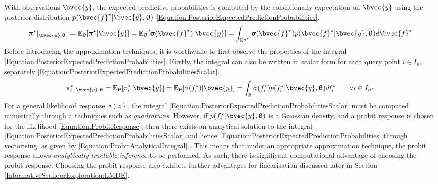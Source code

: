 				With observations $\bvec{y}$, the expected predictive probabilities is computed by the conditionally expectation on $\bvec{y}$ using the posterior distribution $p(\bvec{f}^{\star} | \bvec{y}, \vec{\uptheta})$ \eqref{Equation:PosteriorExpectedPredictionProbabilities}. \begin{equation}
					\bar{\vec{\uppi}}^{\star} |_{\bvec{y}, \vec{\uptheta}} := \mathbb{E}_{\vec{\uptheta}}[\vec{\uppi}^{\star} | \bvec{y}] = \mathbb{E}_{\vec{\uptheta}}[\vec{\upsigma}(\bvec{f}^{\star}) | \bvec{y}] = \int_{\mathbb{R}^{n^{\star}}} \vec{\upsigma}(\bvec{f}^{\star}) p(\bvec{f}^{\star} | \bvec{y}, \vec{\uptheta}) d \bvec{f}^{\star}
				\label{Equation:PosteriorExpectedPredictionProbabilities}
				\end{equation} Before introducing the approximation techniques, it is worthwhile to first observe the properties of the integral \eqref{Equation:PosteriorExpectedPredictionProbabilities}. Firstly, the integral can also be written in scalar form for each query point $i \in I_{n^{\star}}$ separately \eqref{Equation:PosteriorExpectedPredictionProbabilitiesScalar}. \begin{equation}
					 \bar{\pi}^{\star}_{i} |_{\bvec{y}, \vec{\uptheta}} = \mathbb{E}_{\vec{\uptheta}}[\pi^{\star}_{i} | \bvec{y}] = \mathbb{E}_{\vec{\uptheta}}[\sigma(f^{\star}_{i}) | \bvec{y}] = \int_{\mathbb{R}} \sigma(f^{\star}_{i}) p(f^{\star}_{i} | \bvec{y}, \vec{\uptheta}) d f^{\star}_{i} \qquad \forall i \in I_{n^{\star}}
				\label{Equation:PosteriorExpectedPredictionProbabilitiesScalar}
				\end{equation} For a general likelihood response $\sigma(z)$, the integral \eqref{Equation:PosteriorExpectedPredictionProbabilitiesScalar} must be computed numerically through a techniques such as \textit{quadratures}. However, if $p(f^{\star}_{i} | \bvec{y}, \vec{\uptheta})$ is a Gaussian density, and a probit response is chosen for the likelihood \eqref{Equation:ProbitResponse}, then there exists an analytical solution to the integral \eqref{Equation:PosteriorExpectedPredictionProbabilitiesScalar} and hence \eqref{Equation:PosteriorExpectedPredictionProbabilities} through vectorising, as given by \eqref{Equation:ProbitAnalyticalIntegral} \citep{GaussianProcessForMachineLearning}. This means that under an appropriate approximation technique, the probit response allows \textit{analytically tractable inference} to be performed. As such, there is significant computational advantage of choosing the probit response. Choosing the probit response also exhibits further advantages for linearisation discussed later in Section \ref{InformativeSeafloorExploration:LMDE}. \begin{equation}

\end{equation}
